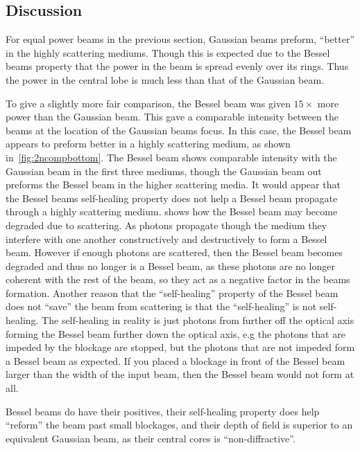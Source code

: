 \FloatBarrier


\subsection{Discussion}

For equal power beams in the previous section, Gaussian beams preform, ``better'' in the highly scattering mediums.
Though this is expected due to the Bessel beams property that the power in the beam is spread evenly over its rings.
Thus the power in the central lobe is much less than that of the Gaussian beam.

To give a slightly more fair comparison, the Bessel beam was given $15\times$ more power than the Gaussian beam.
This gave a comparable intensity between the beams at the location of the Gaussian beams focus.
In this case, the Bessel beam appears to preform better in a highly scattering medium, as shown in~\cref{fig:2ncompbottom}.
The Bessel beam shows comparable intensity with the Gaussian beam in the first three mediums, though the Gaussian beam out preforms the Bessel beam in the higher scattering media.
It would appear that the Bessel beams self-healing property does not help a Bessel beam propagate through a highly scattering medium.
 shows how the Bessel beam may become degraded due to scattering.
As photons propagate though the medium they interfere with one another constructively and destructively to form a Bessel beam.
However if enough photons are scattered, then the Bessel beam becomes degraded and thus no longer is a Bessel beam, as these photons are no longer coherent with the rest of the beam, so they act as a negative factor in the beams formation.
Another reason that the ``self-healing'' property of the Bessel beam does not ``save'' the beam from scattering is that the ``self-healing'' is not self-healing.
The self-healing in reality is just photons from further off the optical axis forming the Bessel beam further down the optical axis, e.g the photons that are impeded by the blockage are stopped, but the photons that are not impeded form a Bessel beam as expected.
If you placed a blockage in front of the Bessel beam larger than the width of the input beam, then the Bessel beam would not form at all.

Bessel beams do have their positives, their self-healing property does help ``reform'' the beam past small blockages, and their depth of field is superior to an equivalent Gaussian beam, as their central cores is ``non-diffractive''.


